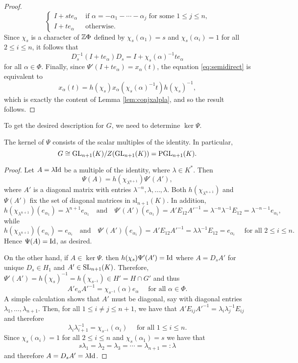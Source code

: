 \begin{proof}
$$\begin{cases}
        I+st e_\alpha & \text{ if }\alpha=-\alpha_1-\cdots-\alpha_j \text{ for some $1\leq j\leq n$,}\\
        I+te_\alpha & \text{ otherwise}.
    \end{cases}$$
    Since $\chi_s$ is a character of $\mathbb{Z}\Phi$ defined by $\chi_s(\alpha_1)=s$ and $\chi_s(\alpha_i)=1$ for all $2\leq i\leq n$, it follows that
    $$D_s^{-1}(I+te_\alpha)D_s=I+\chi_s(\alpha)^{-1}te_\alpha$$
    for all $\alpha\in\Phi$. Finally, since $\Psi'(I+t e_\alpha)=x_\alpha(t)$, the equation \eqref{eq:semidirect} is equivalent to 
    $$x_\alpha(t)=h(\chi_s)x_\alpha(\chi_s(\alpha)^{-1}t)h(\chi_s)^{-1},$$
    which is exactly the content of Lemma \ref{lem:conjxalpla}, and so the result follows. 
\end{proof}

To get the desired description for $G$, we need to determine $\ker\Psi$. 

\begin{lemma}
    The kernel of $\Psi$ consists of the scalar multiples of the identity. In particular, 
    $$G\cong\mathrm{GL}_{n+1}(K)/Z(\mathrm{GL}_{n+1}(K))=\mathrm{PGL}_{n+1}(K).$$
\end{lemma}

\begin{proof}
    Let $A=\lambda\mathrm{Id}$ be a multiple of the identity, where $\lambda\in K^*$. Then
    $$\Psi(A)=h(\chi_{\lambda^{n+1}})\Psi'(A'),$$
    where $A'$ is a diagonal matrix with entries $\lambda^{-n},\lambda,\ldots,\lambda$. Both $h(\chi_{\lambda^{n+1}})$ and $\Psi(A')$ fix the set of diagonal matrices in $\mathrm{sl}_{n+1}(K)$. In addition, 
    $$h(\chi_{\lambda^{n+1}})(e_{\alpha_1})=\lambda^{n+1}e_{\alpha_1}\quad\text{and}\quad \Psi'(A')(e_{\alpha_1})=A'E_{12}A'^{-1}=\lambda^{-n}\lambda^{-1}E_{12}=\lambda^{-n-1}e_{\alpha_i},$$ 
    while 
    $$h(\chi_{\lambda^{n+1}})(e_{\alpha_i})=e_{\alpha_i}\quad\text{and}\quad\Psi'(A')(e_{\alpha_i})=A'E_{12}A'^{-1}=\lambda\lambda^{-1}E_{12}=e_{\alpha_i}\quad\text{ for all }2\leq i\leq n.$$
    Hence $\Psi(A)=\mathrm{Id}$, as desired. 

    On the other hand, if $A\in\ker\Psi$. then $h(\chi_s)\Psi'(A')=\mathrm{Id}$ where $A=D_sA'$ for unique $D_s\in H_1$ and $A'\in\mathrm{SL}_{n+1}(K)$. Therefore, $\Psi'(A')=h(\chi_s)^{-1}=h(\chi_{s^{-1}})\in H'=H\cap G'$ and thus $$A'e_\alpha A'^{-1}=\chi_{s^{-1}}(\alpha)e_\alpha\quad\text{ for all }\alpha\in\Phi.$$
    A simple calculation shows that $A'$ must be diagonal, say with diagonal entries $\lambda_1,\ldots,\lambda_{n+1}$. Then, for all $1\leq i\neq j\leq n+1$, we have that $A'E_{ij}A'^{-1}=\lambda_i\lambda_j^{-1}E_{ij}$ and therefore 
    $$\lambda_i\lambda_{i+1}^{-1}=\chi_{s^{-1}}(\alpha_i)\quad\text{ for all }1\leq i\leq n.$$
    Since $\chi_s(\alpha_i)=1$ for all $2\leq i\leq n$ and $\chi_s(\alpha_1)=s$ we have that 
    $$s\lambda_1=\lambda_2=\lambda_3=\cdots=\lambda_{n+1}=:\lambda$$
    and therefore $A=D_sA'=\lambda\mathrm{Id}$.
\end{proof}